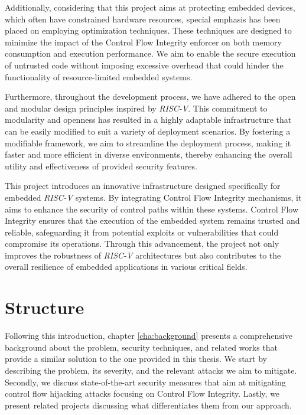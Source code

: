 Additionally, considering that this project aims at protecting embedded devices,
which often have constrained hardware resources, special emphasis has been
placed on employing optimization techniques. These techniques are designed to minimize
the impact of the Control Flow Integrity enforcer on both memory consumption and
execution performance. We aim to enable the secure execution of untrusted code
without imposing excessive overhead that could hinder the functionality of
resource-limited embedded systems.

Furthermore, throughout the development process, we have adhered to the open and
modular design principles inspired by \textit{RISC-V}. This commitment to
modularity and openness has resulted in a highly adaptable infrastructure that
can be easily modified to suit a variety of deployment scenarios. By fostering a
modifiable framework, we aim to streamline the deployment process, making it faster
and more efficient in diverse environments, thereby enhancing the overall
utility and effectiveness of provided security features.

This project introduces an innovative infrastructure designed specifically for
embedded \textit{RISC-V} systems. By integrating Control Flow Integrity
mechanisms, it aims to enhance the security of control paths within these systems.
Control Flow Integrity ensures that the execution of the embedded system remains
trusted and reliable, safeguarding it from potential exploits or vulnerabilities
that could compromise its operations. Through this advancement, the project not only
improves the robustness of \textit{RISC-V} architectures but also contributes to
the overall resilience of embedded applications in various critical fields.

\section{Structure}
\label{sec:intro_structure}

Following this introduction, chapter \ref{cha:background} presents a
comprehensive background about the problem, security techniques, and related
works that provide a similar solution to the one provided in this thesis. We start
by describing the problem, its severity, and the relevant attacks we aim to mitigate.
Secondly, we discuss state-of-the-art security measures that aim at mitigating control
flow hijacking attacks focusing on Control Flow Integrity. Lastly, we present related
projects discussing what differentiates them from our approach.

